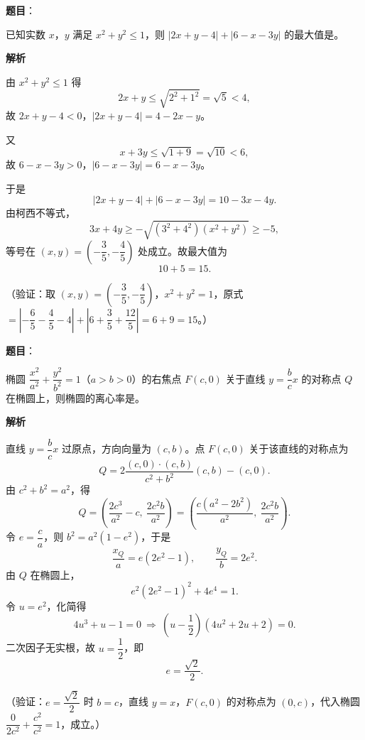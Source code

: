 \begin{answer}

\textbf{题目}：

已知实数 \(x\)，\(y\) 满足 \(x^2+y^2\leqslant1\)，则 \(|2x+y-4|+|6-x-3y|\) 的最大值是\gkblank{}。

\textbf{解析}

由 \(x^2+y^2\leqslant1\) 得
\nopagebreak[4]
\[
2x+y\leqslant\sqrt{2^2+1^2}=\sqrt5<4,
\]
故 \(2x+y-4<0\)，\(|2x+y-4|=4-2x-y\)。

又
\nopagebreak[4]
\[
x+3y\leqslant\sqrt{1+9}=\sqrt{10}<6,
\]
故 \(6-x-3y>0\)，\(|6-x-3y|=6-x-3y\)。

于是
\nopagebreak[4]
\[
|2x+y-4|+|6-x-3y|=10-3x-4y.
\]
由柯西不等式，
\nopagebreak[4]
\[
3x+4y\geqslant-\sqrt{(3^2+4^2)(x^2+y^2)}\geqslant-5,
\]
等号在 \((x,y)=\left(-\dfrac35,-\dfrac45\right)\) 处成立。故最大值为
\nopagebreak[4]
\[
10+5=15.
\]

（验证：取 \((x,y)=\left(-\dfrac35,-\dfrac45\right)\)，\(x^2+y^2=1\)，原式 \(=\left|-\dfrac65-\dfrac45-4\right|+\left|6+\dfrac35+\dfrac{12}{5}\right|=6+9=15\)。）


\end{answer}
\begin{answer}

\textbf{题目}：

椭圆 \(\dfrac{x^2}{a^2}+\dfrac{y^2}{b^2}=1\)（\(a>b>0\)）的右焦点 \(F(c,0)\) 关于直线 \(y=\dfrac{b}{c}x\) 的对称点 \(Q\) 在椭圆上，则椭圆的离心率是\gkblank{}。

\textbf{解析}

直线 \(y=\dfrac{b}c x\) 过原点，方向向量为 \((c,b)\)。点 \(F(c,0)\) 关于该直线的对称点为
\nopagebreak[4]
\[
Q=2\frac{(c,0)\cdot(c,b)}{c^2+b^2}(c,b)-(c,0).
\]
由 \(c^2+b^2=a^2\)，得
\nopagebreak[4]
\[
Q=\left(\frac{2c^3}{a^2}-c,\ \frac{2c^2b}{a^2}\right)
=\left(\frac{c(a^2-2b^2)}{a^2},\ \frac{2c^2b}{a^2}\right).
\]
令 \(e=\dfrac{c}a\)，则 \(b^2=a^2(1-e^2)\)，于是
\nopagebreak[4]
\[
\frac{x_Q}{a}=e(2e^2-1),\qquad \frac{y_Q}{b}=2e^2.
\]
由 \(Q\) 在椭圆上，
\nopagebreak[4]
\[
e^2(2e^2-1)^2+4e^4=1.
\]
令 \(u=e^2\)，化简得
\nopagebreak[4]
\[
4u^3+u-1=0
\ \Longrightarrow\ \left(u-\frac12\right)(4u^2+2u+2)=0.
\]
二次因子无实根，故 \(u=\dfrac12\)，即
\nopagebreak[4]
\[
e=\frac{\sqrt2}{2}.
\]

（验证：\(e=\dfrac{\sqrt2}{2}\) 时 \(b=c\)，直线 \(y=x\)，\(F(c,0)\) 的对称点为 \((0,c)\)，代入椭圆 \(\dfrac{0}{2c^2}+\dfrac{c^2}{c^2}=1\)，成立。）


\end{answer}
